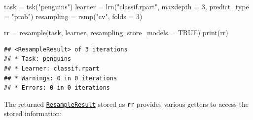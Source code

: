 \documentclass[
]{scrbook}
\newenvironment{Shaded}{\begin{snugshade}}{\end{snugshade}}
\newcommand{\AttributeTok}[1]{\textcolor[rgb]{0.77,0.63,0.00}{#1}}
\newcommand{\ConstantTok}[1]{\textcolor[rgb]{0.00,0.00,0.00}{#1}}
\newcommand{\DecValTok}[1]{\textcolor[rgb]{0.00,0.00,0.81}{#1}}
\newcommand{\FunctionTok}[1]{\textcolor[rgb]{0.00,0.00,0.00}{#1}}
\newcommand{\NormalTok}[1]{#1}
\newcommand{\OtherTok}[1]{\textcolor[rgb]{0.56,0.35,0.01}{#1}}
\newcommand{\StringTok}[1]{\textcolor[rgb]{0.31,0.60,0.02}{#1}}
\renewenvironment{Shaded} {\begin{snugshade}\small} {\end{snugshade}}
\begin{document}
\begin{Shaded}
\begin{Highlighting}[]
\NormalTok{task }\OtherTok{=} \FunctionTok{tsk}\NormalTok{(}\StringTok{"penguins"}\NormalTok{)}
\NormalTok{learner }\OtherTok{=} \FunctionTok{lrn}\NormalTok{(}\StringTok{"classif.rpart"}\NormalTok{, }\AttributeTok{maxdepth =} \DecValTok{3}\NormalTok{, }\AttributeTok{predict\_type =} \StringTok{"prob"}\NormalTok{)}
\NormalTok{resampling }\OtherTok{=} \FunctionTok{rsmp}\NormalTok{(}\StringTok{"cv"}\NormalTok{, }\AttributeTok{folds =} \DecValTok{3}\NormalTok{)}

\NormalTok{rr }\OtherTok{=} \FunctionTok{resample}\NormalTok{(task, learner, resampling, }\AttributeTok{store\_models =} \ConstantTok{TRUE}\NormalTok{)}
\FunctionTok{print}\NormalTok{(rr)}
\end{Highlighting}
\end{Shaded}

\begin{verbatim}
## <ResampleResult> of 3 iterations
## * Task: penguins
## * Learner: classif.rpart
## * Warnings: 0 in 0 iterations
## * Errors: 0 in 0 iterations
\end{verbatim}

The returned \href{https://mlr3.mlr-org.com/reference/ResampleResult.html}{\texttt{ResampleResult}} stored as \texttt{rr} provides various getters to access the stored information:
\end{document}
